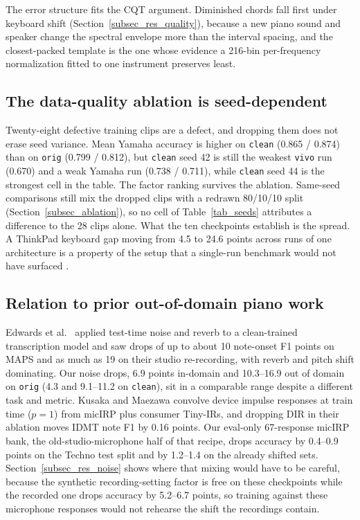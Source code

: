 \documentclass[pdflatex,sn-mathphys-num,iicol]{sn-jnl}
\begin{document}
The error structure fits the CQT argument. Diminished chords fall first under keyboard shift (Section~\ref{subsec_res_quality}), because a new piano sound and speaker change the spectral envelope more than the interval spacing, and the closest-packed template is the one whose evidence a 216-bin per-frequency normalization fitted to one instrument preserves least.

\subsection{The data-quality ablation is seed-dependent}\label{subsec_disc_ablation}

Twenty-eight defective training clips are a defect, and dropping them does not erase seed variance. Mean Yamaha accuracy is higher on \texttt{clean} (0.865 / 0.874) than on \texttt{orig} (0.799 / 0.812), but \texttt{clean} seed 42 is still the weakest \texttt{vivo} run (0.670) and a weak Yamaha run (0.738 / 0.711), while \texttt{clean} seed 44 is the strongest cell in the table. The factor ranking survives the ablation. Same-seed comparisons still mix the dropped clips with a redrawn 80/10/10 split (Section~\ref{subsec_ablation}), so no cell of Table~\ref{tab_seeds} attributes a difference to the 28 clips alone. What the ten checkpoints establish is the spread. A ThinkPad keyboard gap moving from 4.5 to 24.6 points across runs of one architecture is a property of the setup that a single-run benchmark would not have surfaced \cite{Bouthillier2021}.

\subsection{Relation to prior out-of-domain piano work}\label{subsec_disc_edwards}

Edwards et al.\ \cite{Edwards2024} applied test-time noise and reverb to a clean-trained transcription model and saw drops of up to about 10 note-onset F1 points on MAPS and as much as 19 on their studio re-recording, with reverb and pitch shift dominating. Our noise drops, 6.9 points in-domain and 10.3--16.9 out of domain on \texttt{orig} (4.3 and 9.1--11.2 on \texttt{clean}), sit in a comparable range despite a different task and metric. Kusaka and Maezawa \cite{Kusaka2024} convolve device impulse responses at train time ($p=1$) from micIRP plus consumer Tiny-IRs, and dropping DIR in their ablation moves IDMT note F1 by 0.16 points. Our eval-only 67-response micIRP bank, the old-studio-microphone half of that recipe, drops accuracy by 0.4--0.9 points on the Techno test split and by 1.2--1.4 on the already shifted sets. Section~\ref{subsec_res_noise} shows where that mixing would have to be careful, because the synthetic recording-setting factor is free on these checkpoints while the recorded one drops accuracy by 5.2--6.7 points, so training against these microphone responses would not rehearse the shift the recordings contain.
\end{document}
